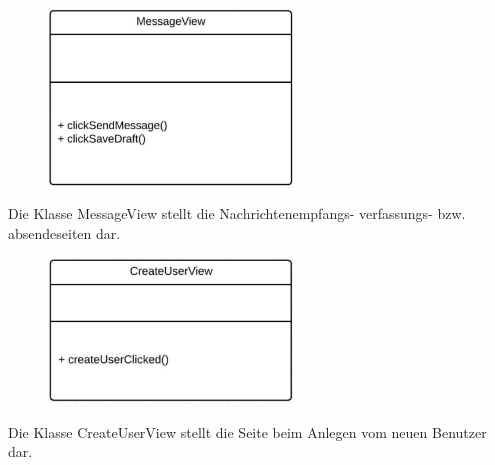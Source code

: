 \begin{itemize}
\begin{itemize}
                                                            \begin{figure}[htb]
                    \centering
                    \includegraphics[width=6.5cm]{Diagramms/class/singleclass/ViewMessage.pdf}
                    \end{figure}
                    \newline
                    Die Klasse MessageView stellt die Nachrichtenempfangs- verfassungs- bzw. absendeseiten dar.
                    \begin{itemize}
                    \end{itemize}

                                                            \begin{figure}[htb]
                    \centering
                    \includegraphics[width=6.5cm]{Diagramms/class/singleclass/ViewCU.pdf}
                    \end{figure}
                    \newline
                    Die Klasse CreateUserView stellt die Seite beim Anlegen vom neuen Benutzer dar.
                    \begin{itemize}
                    \end{itemize}


\end{itemize}
\end{itemize}
